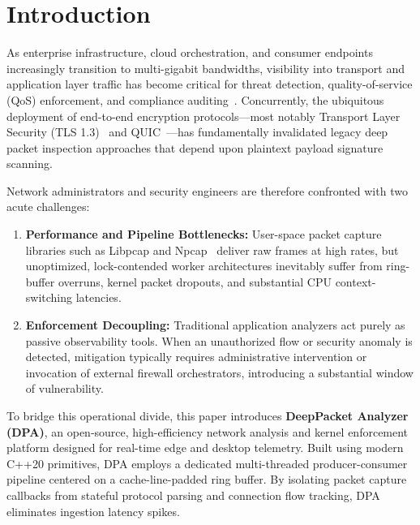 \documentclass[conference]{IEEEtran}
\begin{document}
\section{Introduction}
As enterprise infrastructure, cloud orchestration, and consumer endpoints increasingly transition to multi-gigabit bandwidths, visibility into transport and application layer traffic has become critical for threat detection, quality-of-service (QoS) enforcement, and compliance auditing~\cite{dusi2009statistical}. Concurrently, the ubiquitous deployment of end-to-end encryption protocols---most notably Transport Layer Security (TLS 1.3)~\cite{rescorla2018transport} and QUIC~\cite{iyengar2021quic}---has fundamentally invalidated legacy deep packet inspection approaches that depend upon plaintext payload signature scanning.

Network administrators and security engineers are therefore confronted with two acute challenges:
\begin{enumerate}
    \item \textbf{Performance and Pipeline Bottlenecks:} User-space packet capture libraries such as Libpcap and Npcap~\cite{npcap2024} deliver raw frames at high rates, but unoptimized, lock-contended worker architectures inevitably suffer from ring-buffer overruns, kernel packet dropouts, and substantial CPU context-switching latencies.
    \item \textbf{Enforcement Decoupling:} Traditional application analyzers act purely as passive observability tools. When an unauthorized flow or security anomaly is detected, mitigation typically requires administrative intervention or invocation of external firewall orchestrators, introducing a substantial window of vulnerability.
\end{enumerate}

To bridge this operational divide, this paper introduces \textbf{DeepPacket Analyzer (DPA)}, an open-source, high-efficiency network analysis and kernel enforcement platform designed for real-time edge and desktop telemetry. Built using modern C++20 primitives, DPA employs a dedicated multi-threaded producer-consumer pipeline centered on a cache-line-padded ring buffer. By isolating packet capture callbacks from stateful protocol parsing and connection flow tracking, DPA eliminates ingestion latency spikes.
\end{document}
